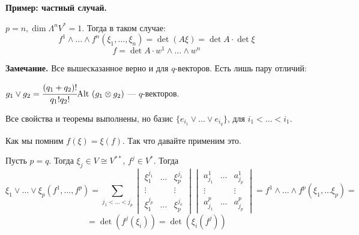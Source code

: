 
\textbf{Пример: частный случай.}

$p=n, \dim \Lambda^n V^* =1 $. Тогда в таком случае:
$$f^1 \wedge \ldots \wedge f^n (\xi_1,\ldots , \xi_n) = \det(A\xi) = \det A \cdot \det \xi$$
$$f = \det A \cdot w^1\wedge \ldots \wedge w^n$$

\textbf{Замечание.} Все вышесказанное верно  и для $q$-векторов. Есть лишь пару отличий:

$g_1 \vee g_2 = \cfrac{(q_1+q_2)!}{q_1!q_2!} \text{Alt }(g_1 \otimes g_2)$ ---  $q$-векторов.

Все свойства и теоремы выполнены, но базис $\{e_{i_1}\vee \ldots \vee e_{i_q} \}$, для $i_1 < \ldots < i_1$.

Как мы помним $f(\xi) = \xi(f)$. Так что давайте применим это.

Пусть $p= q$. Тогда $\xi_j \in V  \cong V^{**}$, $f^j \in V^*$. Тогда
$$\xi_1 \vee \ldots \vee \xi_p(f^1,\ldots, f^p) = \sum\limits_{j_1<\ldots<j_p} \begin{vmatrix}
    \xi_1^{j_1} & \ldots & \xi_p^{j_1}\\
    \vdots & & \vdots \\
    \xi_1^{j_p} & \ldots &\xi_p^{j_o}
\end{vmatrix} \begin{vmatrix}
    a^1_{j_1} & \ldots & a^1_{j_p}\\
    \vdots & & \vdots \\
    a_{j_1}^p & \ldots & a^p_{j_p}
\end{vmatrix} = f^1 \wedge \ldots \wedge f^p(\xi_1,\ldots \xi_p) =$$
$$= \det (f^j(\xi_i))=\det (\xi_i(f^j))$$ 